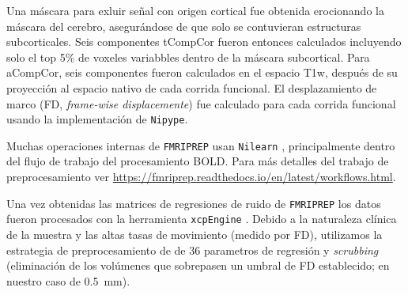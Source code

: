 Una máscara para exluir señal con origen cortical fue obtenida erocionando la máscara del cerebro, asegurándose de que solo se contuvieran estructuras subcorticales.
Seis componentes tCompCor fueron entonces calculados incluyendo solo el top 5\% de voxeles variabbles dentro de la máscara subcortical.
Para aCompCor, seis componentes fueron calculados en el espacio T1w, después de su proyección al espacio nativo de cada corrida funcional.
El desplazamiento de marco (FD, \textit{frame-wise displacemente}) \parencite{Power2014} fue calculado para cada corrida funcional usando la implementación de \texttt{Nipype}.\par
Muchas operaciones internas de \texttt{FMRIPREP} usan \texttt{Nilearn} \parencite{Abraham2014}, principalmente dentro del flujo de trabajo del procesamiento BOLD. Para más detalles del trabajo de preprocesamiento ver \url{https://fmriprep.readthedocs.io/en/latest/workflows.html}.\par
Una vez obtenidas las matrices de regresiones de ruido de \texttt{FMRIPREP} los datos fueron procesados con la herramienta \texttt{xcpEngine} \parencite{Ciric2017}.
Debido a la naturaleza clínica de la muestra y las altas tasas de movimiento (medido por FD), utilizamos la estrategia de preprocesamiento de \textcite{Power2014} de 36 parametros de regresión y \textit{scrubbing} (eliminación de los volúmenes que sobrepasen un umbral de FD establecido; en nuestro caso de \SI{0.5}{\milli\meter}).

